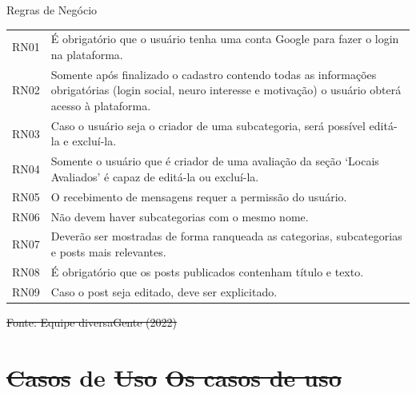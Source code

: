\documentclass[
    12pt,               %
    openright,          %
    oneside,
    a4paper,            %
    paginasA3,  %
    BIBLATEX,           %
    REFINDENT,          %
    MODELO,             %
    TODO,               %
    english,            %
    brazil              %
    ]{ifsp-spo-inf-ctds} %
\providecommand{\DIFadd}[1]{{\protect\color{blue}\uwave{#1}}} %
\providecommand{\DIFdel}[1]{{\protect\color{red}\sout{#1}}}                      %
\providecommand{\DIFaddbegin}{} %
\providecommand{\DIFaddend}{} %
\providecommand{\DIFdelbegin}{} %
\providecommand{\DIFdelend}{} %
\begin{document}
\DIFaddend \begin{quadro}[htb]
	\centering
	\ABNTEXfontereduzida
	\caption[Regras de Negócio]{Regras de Negócio}
	\DIFdelbegin %
\DIFdelend \DIFaddbegin \label{regra-negocio}
	\DIFaddend \begin{tabular}{|p{3.3cm}|p{10.3cm}|}
		\hline
		\thead{Código} & \thead{Regra de negócio} \\
		\hline
		RN01 & É obrigatório que o usuário tenha uma conta Google para fazer o login na plataforma. \\
		\hline
		RN02 & Somente após finalizado o cadastro contendo todas as informações obrigatórias (login social, neuro interesse e motivação) o usuário obterá acesso à plataforma.\\
		\hline
		RN03 & Caso o usuário seja o criador de uma subcategoria, será possível editá-la e excluí-la.  \\
		\hline
		RN04 & Somente o usuário que é criador de uma avaliação da seção ‘Locais Avaliados’ é capaz de editá-la ou excluí-la. \\
		\hline
		RN05 & O recebimento de mensagens requer a permissão do usuário. \\
		\hline
		RN06 & Não devem haver subcategorias com o mesmo nome. \\
		\hline
		RN07 & Deverão ser mostradas de forma ranqueada as categorias, subcategorias e posts mais relevantes.\\
		\hline
		RN08 & É obrigatório que os posts publicados contenham título e texto.\\
		\hline
		RN09 & Caso o post seja editado, deve ser explicitado.\\
		\hline
	\end{tabular}
	\DIFdelbegin %
\textbf{}{\DIFdel{Fonte: Equipe diversaGente (2022)}} %
\DIFdelend \DIFaddbegin {}
\DIFaddend \end{quadro}\pagebreak



\section{\DIFdelbegin \DIFdel{Casos }\DIFdelend \DIFaddbegin \DIFadd{Critérios }\DIFaddend de \DIFdelbegin \DIFdel{Uso}%
\DIFdel{Os casos de uso }\DIFdelend \DIFaddbegin \DIFadd{segurança}}
\end{document}
